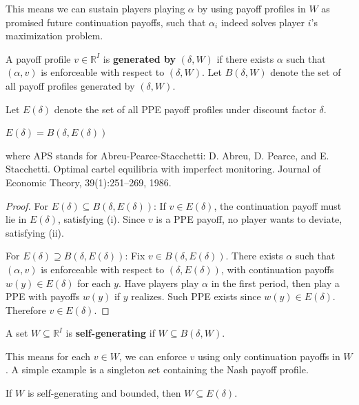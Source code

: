 \documentclass[11pt]{elegantbook_2}
\begin{document}
This means we can sustain players playing $\alpha$ by using payoff profiles in $W$ as promised future continuation payoffs, such that $\alpha_i$ indeed solves player $i$'s maximization problem.

\begin{definition}
    A payoff profile $v\in\mathbb{R}^I$ is \textbf{generated by} $(\delta,W)$ if there exists $\alpha$ such that $(\alpha,v)$ is enforceable with respect to $(\delta,W)$. Let $B(\delta,W)$ denote the set of all payoff profiles generated by $(\delta,W)$.
\end{definition}

Let $E(\delta)$ denote the set of all PPE payoff profiles under discount factor $\delta$.

\begin{theorem}[APS]
    $E(\delta)=B(\delta,E(\delta))$
\end{theorem}
where APS stands for Abreu-Pearce-Stacchetti: D. Abreu, D. Pearce, and E. Stacchetti. Optimal cartel equilibria with imperfect monitoring. Journal of Economic Theory, 39(1):251–269, 1986.

\begin{proof}
    For $E(\delta)\subseteq B(\delta,E(\delta))$: If $v\in E(\delta)$, the continuation payoff must lie in $E(\delta)$, satisfying (i). Since $v$ is a PPE payoff, no player wants to deviate, satisfying (ii).
    
    For $E(\delta)\supseteq B(\delta,E(\delta))$: Fix $v\in B(\delta,E(\delta))$. There exists $\alpha$ such that $(\alpha,v)$ is enforceable with respect to $(\delta,E(\delta))$, with continuation payoffs $w(y)\in E(\delta)$ for each $y$. Have players play $\alpha$ in the first period, then play a PPE with payoffs $w(y)$ if $y$ realizes. Such PPE exists since $w(y)\in E(\delta)$. Therefore $v\in E(\delta)$.
\end{proof}

\begin{definition}
    A set $W\subseteq\mathbb{R}^I$ is \textbf{self-generating} if $W\subseteq B(\delta,W)$.
\end{definition}

This means for each $v\in W$, we can enforce $v$ using only continuation payoffs in $W$. A simple example is a singleton set containing the Nash payoff profile.

\begin{theorem}
    If $W$ is self-generating and bounded, then $W\subseteq E(\delta)$.
\end{theorem}
\end{document}
